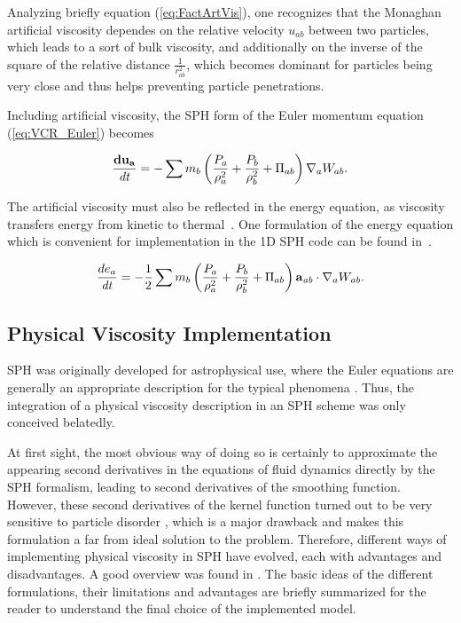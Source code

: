 \documentclass{report}
\begin{document}
Analyzing briefly equation (\ref{eq:FactArtVis}), one recognizes that the Monaghan artificial viscosity dependes on the relative velocity $u_{ab}$ between two particles, which leads to a sort of bulk viscosity, and additionally on the inverse of the square of the relative distance $\frac{1}{r_{ab}^2}$, which becomes dominant for particles being very close and thus helps preventing particle penetrations. 

Including artificial viscosity, the SPH form of the Euler momentum equation (\ref{eq:VCR_Euler}) becomes~\cite{Monaghan2005}

\begin{equation}
\label{eq:VCR_EulerInclArtVis}
\frac{{\bf du_{a}}}{\mathit{dt}}=-\sum {m_{b}\left(\frac{P_{a}}{\rho_{a}^{2}}+\frac{P_{b}}{\rho _{b}^{2}}+\Pi _{ab}\right)\nabla_{a}W_{ab}}.
\end{equation}



The artificial viscosity must also be reflected in the energy equation, as viscosity transfers energy from kinetic to thermal~\cite{Monaghan2005}. One formulation of the energy equation which is convenient for implementation in the 1D SPH code %
can be found in~\cite{Liu2003}.

\begin{equation}
\label{eq:ECR_EulerInclArtVis}
\frac{de_{a}}{\mathit{dt}}=-\mathit{}\frac{1}{2}\sum{m_{b}\left(\frac{P_{a}}{\rho _{a}^{2}}+\frac{P_{b}}{\rho _{b}^{2}}+\Pi _{ab}\right){\bf a_{\mathit{ab}}}\cdot\nabla _{a}W_{\mathit{ab}}}.
\end{equation}

\subsection{Physical Viscosity Implementation}
\label{sec:PhysViscDescr}

SPH was originally developed for astrophysical use, where the Euler equations are generally an appropriate description for the typical phenomena \cite{Liu2003}. Thus, the integration of a physical viscosity description in an SPH scheme was only conceived belatedly. 

At first sight, the most obvious way of doing so is certainly to approximate the appearing second derivatives in the equations of fluid dynamics directly by the SPH formalism, leading to second derivatives of the smoothing function. However, these second derivatives of the kernel function turned out to be very sensitive to particle disorder \cite{Brookshaw1986,Monaghan1988}, which is a major drawback and makes this formulation a far from ideal solution to the problem. Therefore, different ways of implementing physical viscosity in SPH have evolved, each with advantages and disadvantages. A good overview was found in \cite{Basa2009}. The basic ideas of the different formulations, their limitations and advantages are briefly summarized for the reader to understand the final choice of the implemented model.
\end{document}
